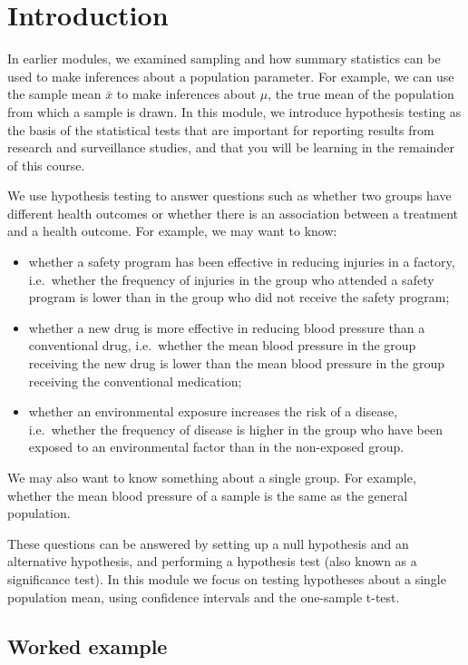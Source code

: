\documentclass[
  a4paper,
]{memoir}
\providecommand{\tightlist}{%
  \setlength{\itemsep}{0pt}\setlength{\parskip}{0pt}}
\begin{document}
\section{Introduction}\label{introduction-3}

In earlier modules, we examined sampling and how summary statistics can
be used to make inferences about a population parameter. For example, we
can use the sample mean \(\bar{x}\) to make inferences about \(\mu\),
the true mean of the population from which a sample is drawn. In this
module, we introduce hypothesis testing as the basis of the statistical
tests that are important for reporting results from research and
surveillance studies, and that you will be learning in the remainder of
this course.

We use hypothesis testing to answer questions such as whether two groups
have different health outcomes or whether there is an association
between a treatment and a health outcome. For example, we may want to
know:

\begin{itemize}
\tightlist
\item
  whether a safety program has been effective in reducing injuries in a
  factory, i.e.~whether the frequency of injuries in the group who
  attended a safety program is lower than in the group who did not
  receive the safety program;
\item
  whether a new drug is more effective in reducing blood pressure than a
  conventional drug, i.e.~whether the mean blood pressure in the group
  receiving the new drug is lower than the mean blood pressure in the
  group receiving the conventional medication;
\item
  whether an environmental exposure increases the risk of a disease,
  i.e.~whether the frequency of disease is higher in the group who have
  been exposed to an environmental factor than in the non-exposed group.
\end{itemize}

We may also want to know something about a single group. For example,
whether the mean blood pressure of a sample is the same as the general
population.

These questions can be answered by setting up a null hypothesis and an
alternative hypothesis, and performing a hypothesis test (also known as
a significance test). In this module we focus on testing hypotheses
about a single population mean, using confidence intervals and the
one-sample t-test.

\subsection{Worked example}\label{worked-example-2}
\end{document}
